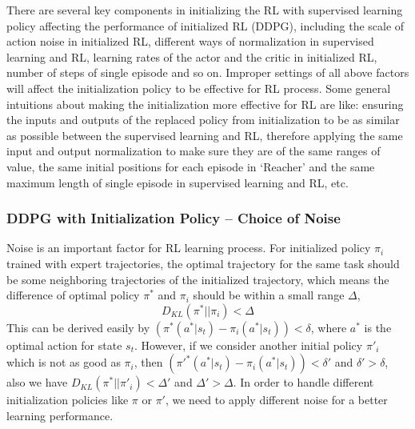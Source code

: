 \documentclass{article}
\begin{document}
There are several key components in initializing the RL with supervised learning policy affecting the performance of initialized RL (DDPG), including the scale of action noise in initialized RL, different ways of normalization in supervised learning and RL, learning rates of the actor and the critic in initialized RL, number of steps of single episode and so on. Improper settings of all above factors will affect the initialization policy to be effective for RL process. Some general intuitions about making the initialization more effective for RL are like: ensuring the inputs and outputs of the replaced policy from initialization to be as similar as possible between the supervised learning and RL, therefore applying the same input and output normalization to make sure they are of the same ranges of value, the same initial positions for each episode in `Reacher' and the same maximum length of single episode in supervised learning and RL, etc. 

\subsubsection{DDPG with Initialization Policy -- Choice of Noise}
Noise is an important factor for RL learning process. For initialized policy $\pi_i$ trained with expert trajectories, the optimal trajectory for the same task should be some neighboring trajectories of the initialized trajectory, which means the difference of optimal policy $\pi^*$ and $\pi_i$ should be within a small range $\Delta$,
\begin{equation}
	D_{KL}(\pi^*||\pi_i)<\Delta
\end{equation}
This can be derived easily by $(\pi^*(a^*|s_t)- \pi_i(a^*|s_t))<\delta$, where $a^*$ is the optimal action for state $s_t$. However, if we consider another initial policy $\pi'_i$ which is not as good as $\pi_i$, then $(\pi'^*(a^*|s_t)- \pi_i(a^*|s_t))<\delta'$ and $\delta'>\delta$, also we have $D_{KL}(\pi^*||\pi'_i)<\Delta'$ and $\Delta'>\Delta$. In order to handle different initialization policies like $\pi$ or $\pi'$, we need to apply different noise for a better learning performance.
\end{document}
